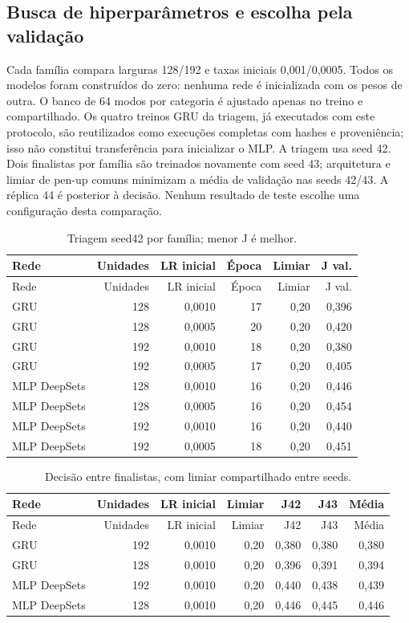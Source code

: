 \documentclass[11pt,a4paper]{article}
\begin{document}
\subsection{Busca de hiperparâmetros e escolha pela validação}
Cada família compara larguras 128/192 e taxas iniciais 0,001/0,0005. Todos os modelos foram construídos do zero: nenhuma rede é inicializada com os pesos de outra. O banco de 64 modos por categoria é ajustado apenas no treino e compartilhado. Os quatro treinos GRU da triagem, já executados com este protocolo, são reutilizados como execuções completas com hashes e proveniência; isso não constitui transferência para inicializar o MLP. A triagem usa seed 42. Dois finalistas por família são treinados novamente com seed 43; arquitetura e limiar de pen-up comuns minimizam a média de validação nas seeds 42/43. A réplica 44 é posterior à decisão. Nenhum resultado de teste escolhe uma configuração desta comparação.
\begingroup\small\setlength{\tabcolsep}{4pt}\begin{longtable}{lrrrrr}
\caption{Triagem seed42 por família; menor J é melhor.}\\
\toprule
Rede & Unidades & LR inicial & Época & Limiar & J val. \\ 
\midrule\endfirsthead
\toprule
Rede & Unidades & LR inicial & Época & Limiar & J val. \\ 
\midrule\endhead
\bottomrule\endfoot
GRU & 128 & 0,0010 & 17 & 0,20 & 0,396 \\
GRU & 128 & 0,0005 & 20 & 0,20 & 0,420 \\
GRU & 192 & 0,0010 & 18 & 0,20 & 0,380 \\
GRU & 192 & 0,0005 & 17 & 0,20 & 0,405 \\
MLP DeepSets & 128 & 0,0010 & 16 & 0,20 & 0,446 \\
MLP DeepSets & 128 & 0,0005 & 16 & 0,20 & 0,454 \\
MLP DeepSets & 192 & 0,0010 & 16 & 0,20 & 0,440 \\
MLP DeepSets & 192 & 0,0005 & 18 & 0,20 & 0,451 \\
\end{longtable}\endgroup
\begingroup\small\setlength{\tabcolsep}{4pt}\begin{longtable}{lrrrrrr}
\caption{Decisão entre finalistas, com limiar compartilhado entre seeds.}\\
\toprule
Rede & Unidades & LR inicial & Limiar & J42 & J43 & Média \\ 
\midrule\endfirsthead
\toprule
Rede & Unidades & LR inicial & Limiar & J42 & J43 & Média \\ 
\midrule\endhead
\bottomrule\endfoot
GRU & 192 & 0,0010 & 0,20 & 0,380 & 0,380 & 0,380 \\
GRU & 128 & 0,0010 & 0,20 & 0,396 & 0,391 & 0,394 \\
MLP DeepSets & 192 & 0,0010 & 0,20 & 0,440 & 0,438 & 0,439 \\
MLP DeepSets & 128 & 0,0010 & 0,20 & 0,446 & 0,445 & 0,446 \\
\end{longtable}\endgroup
\end{document}
